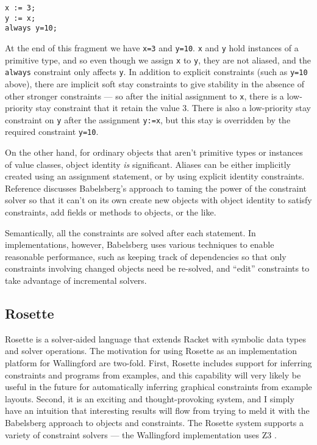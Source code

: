 \documentclass{sig-alternate-05-2015}
\begin{document}
\begin{verbatim}
x := 3;
y := x;
always y=10;
\end{verbatim}

At the end of this fragment we have \verb|x=3| and \verb|y=10|.  \verb|x|
and \verb|y| hold instances of a primitive type, and so even though we
assign \verb|x| to \verb|y|, they are not aliased, and the \verb|always|
constraint only affects \verb|y|.  In addition to explicit constraints
(such as \verb|y=10| above), there are implicit soft stay constraints to
give stability in the absence of other stronger constraints --- so after
the initial assignment to \verb|x|, there is a low-priority stay constraint
that it retain the value 3.  There is also a low-priority stay
constraint on \verb|y| after the assignment \verb|y:=x|, but this stay is
overridden by the required constraint \verb|y=10|.

On the other hand, for ordinary objects that aren't primitive types or
instances of value classes, object identity \emph{is} significant.  Aliases
can be either implicitly created using an assignment statement, or by using
explicit identity constraints.  Reference \cite{felgentreff-oopsla-2015}
discusses Babelsberg's approach to taming the power of the constraint
solver so that it can't on its own create new objects with object identity
to satisfy constraints, add fields or methods to objects, or the like.

Semantically, all the constraints are solved after each statement.  In
implementations, however, Babelsberg uses various techniques to enable
reasonable performance, such as keeping track of dependencies so that only
constraints involving changed objects need be re-solved, and ``edit''
constraints to take advantage of incremental solvers.

\subsection{Rosette}
\label{sec:rosette}

Rosette \cite{torlak-onward-2013,torlak-pldi-2014} is a solver-aided 
language that extends Racket \cite{racket} with
symbolic data types and solver operations.  The motivation for using
Rosette as an implementation platform for Wallingford are two-fold.  First,
Rosette includes support for inferring constraints and programs from
examples, and this capability will very likely be useful in the future for
automatically inferring graphical constraints from example layouts.
Second, it is an exciting and thought-provoking system, and I simply have
an intuition that interesting results will flow from trying to meld it with
the Babelsberg approach to objects and constraints.
The Rosette system supports a variety of constraint solvers --- the
Wallingford implementation uses Z3 \cite{demoura-z3-2008}.
\end{document}
